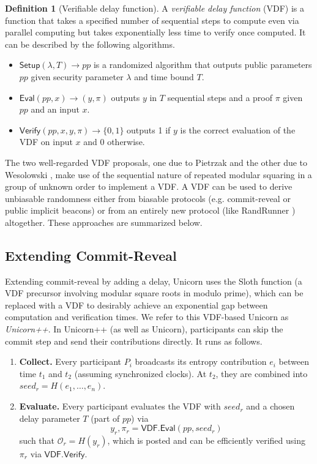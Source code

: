 \documentclass[conference]{IEEEtran}
\theoremstyle{definition}
\newtheorem{definition}[theorem]{Definition}
\theoremstyle{remark}
\begin{document}
\begin{definition}[Verifiable delay function]
A \textit{verifiable delay function} (VDF) is a function that takes a specified number of sequential steps to compute even via parallel computing but takes exponentially less time to verify once computed. It can be described by the following algorithms.
\begin{itemize}
\item $\mathsf{Setup}(\lambda, T) \rightarrow pp$ is a randomized algorithm that outputs public parameters $pp$ given security parameter $\lambda$ and time bound $T$.
\item $\mathsf{Eval}(pp, x) \rightarrow (y, \pi)$ outputs $y$ in $T$ sequential steps and a proof $\pi$ given $pp$ and an input $x$.
\item $\mathsf{Verify}(pp, x, y, \pi) \rightarrow \{0, 1\}$ outputs 1 if $y$ is the correct evaluation of the VDF on input $x$ and 0 otherwise.
\end{itemize}
\end{definition}

The two well-regarded VDF proposals, one due to Pietrzak \cite{pietrzak2018simple} and the other due to Wesolowski \cite{wesolowski2019efficient}, make use of the sequential nature of repeated modular squaring in a group of unknown order to implement a VDF. A VDF can be used to derive unbiasable randomness either from biasable protocols (e.g. commit-reveal or public implicit beacons) or from an entirely new protocol (like RandRunner \cite{schindler2021randrunner}) altogether. These approaches are summarized below.

\subsection{Extending Commit-Reveal}
\label{subsection:extending-commit-reveal}
Extending commit-reveal by adding a delay, Unicorn \cite{lenstra2015random} uses the Sloth function (a VDF precursor involving modular square roots in modulo prime), which can be replaced with a VDF to desirably achieve an exponential gap between computation and verification times. We refer to this VDF-based Unicorn as \textit{Unicorn++}. In Unicorn++ (as well as Unicorn), participants can skip the commit step and send their contributions directly. It runs as follows.
\begin{enumerate}
    \item \textbf{Collect.} Every participant $P_i$ broadcasts its entropy contribution $e_i$ between time $t_1$ and $t_2$ (assuming synchronized clocks). At $t_2$, they are combined into $seed_r = H(e_1,\ldots, e_n)$.
    \item \textbf{Evaluate.} Every participant evaluates the VDF with $seed_r$ and a chosen delay parameter $T$ (part of $pp$) via
    $$y_r, \pi_r = \mathsf{VDF.Eval}(pp, seed_r)$$
    such that $\mathcal{O}_r = H(y_r)$, which is posted and can be efficiently verified using $\pi_r$ via $\mathsf{VDF.Verify}$.
\end{enumerate}
\end{document}

